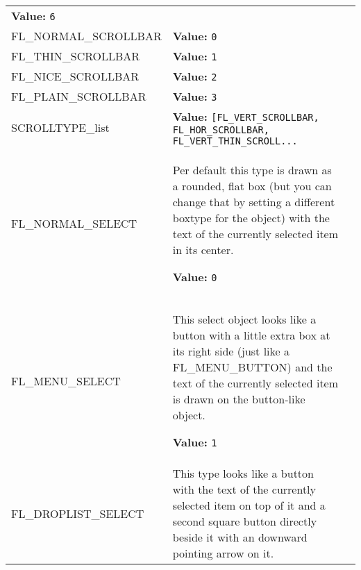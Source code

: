 \begin{longtable}{|p{\varnamewidth}|p{\vardescrwidth}|l}
\textbf{Value:} 
{\tt 6}&\\
\cline{1-2}
\raggedright F\-L\-\_\-N\-O\-R\-M\-A\-L\-\_\-S\-C\-R\-O\-L\-L\-B\-A\-R\- & \raggedright \textbf{Value:} 
{\tt 0}&\\
\cline{1-2}
\raggedright F\-L\-\_\-T\-H\-I\-N\-\_\-S\-C\-R\-O\-L\-L\-B\-A\-R\- & \raggedright \textbf{Value:} 
{\tt 1}&\\
\cline{1-2}
\raggedright F\-L\-\_\-N\-I\-C\-E\-\_\-S\-C\-R\-O\-L\-L\-B\-A\-R\- & \raggedright \textbf{Value:} 
{\tt 2}&\\
\cline{1-2}
\raggedright F\-L\-\_\-P\-L\-A\-I\-N\-\_\-S\-C\-R\-O\-L\-L\-B\-A\-R\- & \raggedright \textbf{Value:} 
{\tt 3}&\\
\cline{1-2}
\raggedright S\-C\-R\-O\-L\-L\-T\-Y\-P\-E\-\_\-l\-i\-s\-t\- & \raggedright \textbf{Value:} 
{\tt [FL\_VERT\_SCROLLBAR, FL\_HOR\_SCROLLBAR, FL\_VERT\_THIN\_SCROLL\texttt{...}}&\\
\cline{1-2}
\raggedright F\-L\-\_\-N\-O\-R\-M\-A\-L\-\_\-S\-E\-L\-E\-C\-T\- & \raggedright Per default this type is drawn as a rounded, flat box (but you can change
that by setting a different boxtype for the object) with the text of the
currently selected item in its center.

\textbf{Value:} 
{\tt 0}&\\
\cline{1-2}
\raggedright F\-L\-\_\-M\-E\-N\-U\-\_\-S\-E\-L\-E\-C\-T\- & \raggedright This select object looks like a button with a little extra box at its right
side (just like a FL\_MENU\_BUTTON) and the text of the currently selected item
is drawn on the button-like object.

\textbf{Value:} 
{\tt 1}&\\
\cline{1-2}
\raggedright F\-L\-\_\-D\-R\-O\-P\-L\-I\-S\-T\-\_\-S\-E\-L\-E\-C\-T\- & \raggedright This type looks like a button with the text of the currently selected item
on top of it and a second square button directly beside it with an downward
pointing arrow on it.


\end{longtable}
